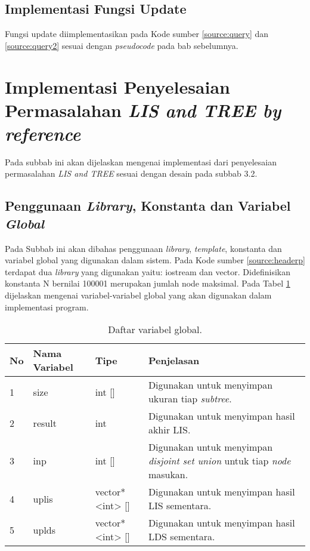 	\subsection{\quad Implementasi Fungsi Update}
	\quad Fungsi update diimplementasikan pada Kode sumber \ref{source:query} dan \ref{source:query2} sesuai dengan \textit{pseudocode} pada bab sebelumnya.
	
	
\section{\quad Implementasi Penyelesaian Permasalahan \textit{LIS and TREE by reference}}
\quad Pada subbab ini akan dijelaskan mengenai implementasi dari penyelesaian permasalahan \textit{LIS and TREE} sesuai dengan desain pada subbab 3.2.	
	\subsection{\quad Penggunaan \textit{Library}, Konstanta dan Variabel \textit{Global}}
	\quad Pada Subbab ini akan dibahas penggunaan \textit{library}, \textit{template}, konstanta dan variabel global yang digunakan dalam sistem. Pada Kode sumber \ref{source:headerp} terdapat dua \textit{library} yang digunakan yaitu: iostream dan vector. Didefinisikan konstanta N bernilai 100001 merupakan jumlah node maksimal. Pada Tabel \ref{tabel:var_globalp} dijelaskan mengenai variabel-variabel global yang akan digunakan dalam implementasi program.
	
	\begin{table}[H]
		\centering
		\begin{tabular}{|p{0.5cm}|p{3cm}|p{2.5cm}|p{3cm}|}
			\hline
			No&Nama Variabel&Tipe&Penjelasan \\ \hline
			1&size&int []&Digunakan untuk menyimpan ukuran tiap \textit{subtree}.\\ \hline
			2&result&int&Digunakan untuk menyimpan hasil akhir LIS.\\ \hline
			3&inp&int []&Digunakan untuk menyimpan \textit{disjoint set union} untuk tiap \textit{node} masukan.\\ \hline
			4&uplis&vector*<int> []&Digunakan untuk menyimpan hasil LIS sementara.\\ \hline
			5&uplds&vector*<int> []&Digunakan untuk menyimpan hasil LDS sementara.\\ \hline
		\end{tabular}\caption{Daftar variabel global. \label{tabel:var_globalp}}	
	\end{table}
